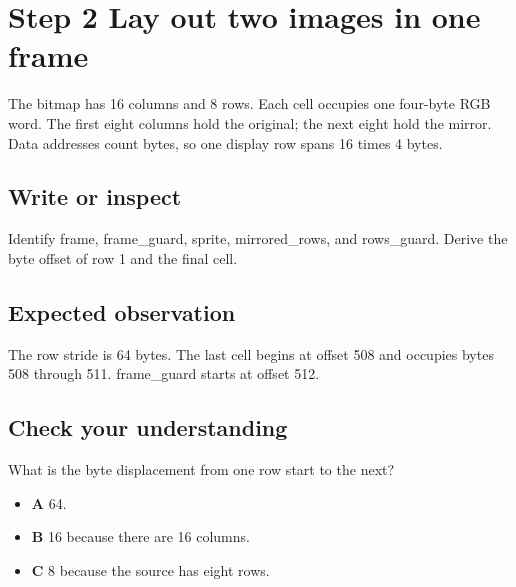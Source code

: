 \section{Step 2 Lay out two images in one
  frame}\label{003-eight-byte-sprite-s02-step-2-lay-out-two-images-in-one-frame}

The bitmap has 16 columns and 8 rows. Each cell occupies one four-byte
RGB word. The first eight columns hold the original; the next eight hold
the mirror. Data addresses count bytes, so one display row spans 16
times 4 bytes.

\subsection{Write or
  inspect}\label{003-eight-byte-sprite-s02-write-or-inspect}

Identify frame, frame\_guard, sprite, mirrored\_rows, and rows\_guard.
Derive the byte offset of row 1 and the final cell.

\subsection{Expected
  observation}\label{003-eight-byte-sprite-s02-expected-observation}

The row stride is 64 bytes. The last cell begins at offset 508 and
occupies bytes 508 through 511. frame\_guard starts at offset 512.

\subsection{Check your
  understanding}\label{003-eight-byte-sprite-s02-check-your-understanding}

What is the byte displacement from one row start to the next?

\begin{itemize}
  \tightlist
  \item
        \textbf{A} 64.
  \item
        \textbf{B} 16 because there are 16 columns.
  \item
        \textbf{C} 8 because the source has eight rows.
\end{itemize}
